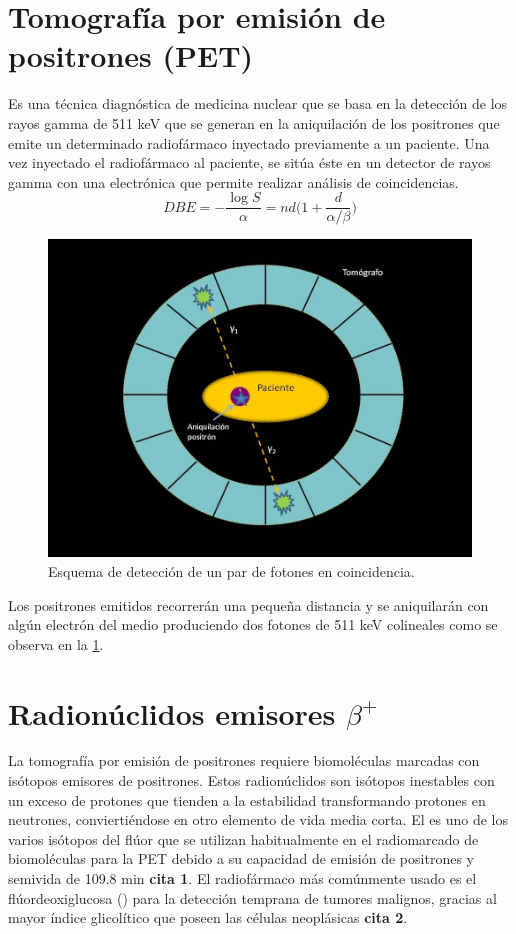 \documentclass[12pt,a4paper,onecolumn]{article}
\begin{document}
\section{Tomografía por emisión de positrones (PET)}
Es una técnica diagnóstica de medicina  nuclear que se basa en la detección de los rayos gamma de 511 keV que se generan en la aniquilación de los positrones que emite un determinado radiofármaco inyectado previamente a un paciente. Una vez inyectado el radiofármaco al paciente, se sitúa éste en un detector de rayos gamma con una electrónica que permite realizar análisis de coincidencias.
\begin{equation}
DBE=-\frac{\log S}{\alpha}=nd\Big(1+\frac{d}{\alpha/\beta}\Big)
\end{equation}
\begin{figure}[h]
	\centering
	\includegraphics[width=0.5\linewidth]{aniquila}
	\caption{Esquema de detección de un par de fotones en coincidencia.}
	\label{fig:aniquila}
\end{figure}

Los positrones  emitidos recorrerán una pequeña distancia y se aniquilarán con algún electrón del medio produciendo dos fotones de 511 keV colineales como se observa en la \ref{fig:aniquila}.
\section{Radionúclidos emisores $\beta^+$}
La tomografía por emisión de positrones requiere biomoléculas marcadas con isótopos emisores de positrones. Estos radionúclidos son isótopos inestables con un exceso de protones que tienden a la estabilidad transformando protones en neutrones, conviertiéndose en otro elemento de vida media corta. El  es uno de los varios isótopos del flúor que se utilizan habitualmente en el radiomarcado de biomoléculas para la PET debido a su capacidad de emisión de positrones y semivida de 109.8 min \textbf{cita 1}. El radiofármaco más comúnmente usado es el flúordeoxiglucosa () para la detección temprana de tumores malignos, gracias al mayor índice glicolítico que poseen las células neoplásicas \textbf{cita 2}.
\end{document}
